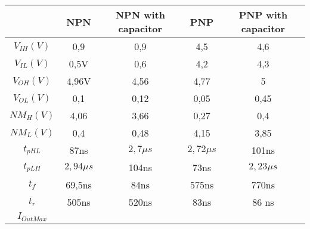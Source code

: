 \documentclass[a4paper,11pt]{report}
\begin{document}
\begin{tabular}{|c|c|c|c|c|}
\hline
 & NPN & NPN with capacitor &PNP& PNP with capacitor\\
\hline
\hline
$V_{IH} (V)$ & 0,9 & 0,9 & 4,5 & 4,6  \\
\hline
$V_{IL} (V)$ & 0,5V & 0,6 & 4,2 & 4,3 \\
\hline
$V_{OH} (V)$ & 4,96V & 4,56 & 4,77 & 5 \\
\hline
$V_{OL} (V)$ & 0,1 & 0,12 & 0,05 & 0,45\\ 
\hline
$NM_{H} (V) $ & 4,06 & 3,66 & 0,27 & 0,4\\ %
\hline
$NM_{L} (V) $ & 0,4 & 0,48 & 4,15 & 3,85 \\  %
\hline
$t_{pHL}$ & 87ns & $2,7\mu s $ &  $2,72\mu s$ & 101ns \\
\hline
$t_{pLH}$ & $2,94\mu s$ &  104ns &  73ns &  $2,23\mu s$\\
\hline
$t_{f}$ & 69,5ns & 84ns & 575ns & 770ns\\
\hline
$t_{r}$ & 505ns & 520ns & 83ns & 86 ns\\
\hline
$ I_{Out{Max}}$ &   &   &   &   \\ %
\hline
\end{tabular}
\end{document}
